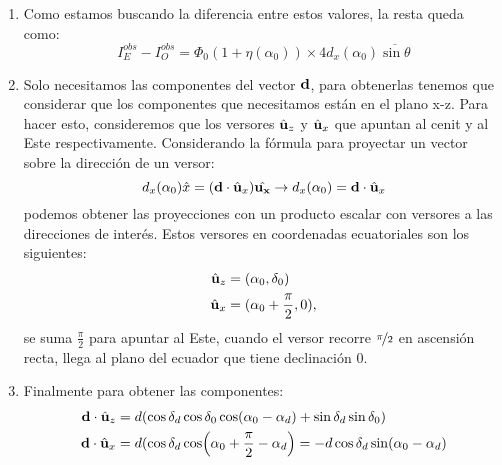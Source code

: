 \begin{enumerate}
    \item Como estamos buscando la diferencia entre estos valores, la resta queda como:
    \begin{equation*}
        I^{obs}_E -  I^{obs}_O = \Phi_0 (1+ \eta(\alpha_0)) \times 4  d_x(\alpha_0)\overline{\sin\theta}
    \end{equation*}
    
    \item Solo necesitamos las componentes del vector $\bf{d}$, para obtenerlas tenemos que considerar que los componentes que necesitamos están en el plano x-z. Para hacer esto, consideremos que los versores $\hat{\bf{u}}_z$ y $\hat{\bf{u}}_x$ que apuntan al cenit y al Este respectivamente. Considerando la fórmula para proyectar un vector sobre la dirección de un versor:
    \begin{equation}
        d_x(\alpha_0) \hat{x} =  (\textbf{d}\cdot\hat{\bf{u}}_x)\hat{\bf{u_x}} \rightarrow d_x(\alpha_0) = \textbf{d}\cdot\hat{\bf{u}}_x
    \end{equation}
    podemos obtener las proyecciones con un producto escalar con versores a las direcciones de interés. Estos versores en coordenadas ecuatoriales son los siguientes:
    \begin{align*}
        \hat{\bf{u}}_z &= (\alpha_0,\delta_0 )\\
        \hat{\bf{u}}_x &= (\alpha_0 + \frac{\pi}{2},0), 
    \end{align*}
    se suma  $\frac{\pi}{2}$ para apuntar al Este, cuando el versor recorre $\nicefrac{\pi}{2}$ en ascensión recta, llega al plano del ecuador que tiene declinación $0$.
    \item Finalmente para obtener las componentes:
    \begin{align*}
        \textbf{d}\cdot\hat{\bf{u}}_z &= d (\cos\delta_d \cos\delta_0 \cos(\alpha_0 - \alpha_d) + \sin\delta_d  \sin\delta_0)\\
        \textbf{d}\cdot\hat{\bf{u}}_x &= d (\cos\delta_d \cos(\alpha_0 +\frac{\pi}{2} - \alpha_d) 
        = -d\cos\delta_d \sin(\alpha_0  - \alpha_d)
    \end{align*}
    

\end{enumerate}

